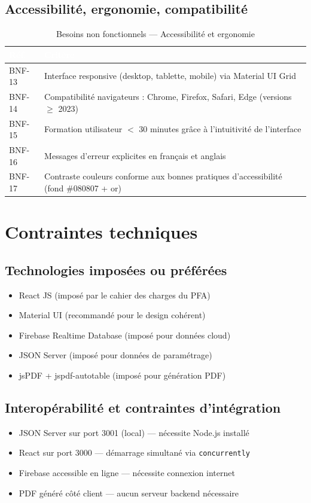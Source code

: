\documentclass[12pt,a4paper]{report}
\begin{document}
\subsection{Accessibilité, ergonomie, compatibilité}

\begin{table}[H]
\centering
\caption{Besoins non fonctionnels — Accessibilité et ergonomie}
\label{tab:bnf_ergo}
\begin{tabularx}{\textwidth}{|l|X|}
\hline
\rowcolor{emsiblue}\textcolor{white}{\textbf{Réf.}} & \textcolor{white}{\textbf{Critère}} \\
\hline
BNF-13 & Interface responsive (desktop, tablette, mobile) via Material UI Grid \\
BNF-14 & Compatibilité navigateurs : Chrome, Firefox, Safari, Edge (versions $\geq$ 2023) \\
BNF-15 & Formation utilisateur $<$ 30 minutes grâce à l'intuitivité de l'interface \\
BNF-16 & Messages d'erreur explicites en français et anglais \\
BNF-17 & Contraste couleurs conforme aux bonnes pratiques d'accessibilité (fond \#080807 + or) \\
\hline
\end{tabularx}
\end{table}

\section{Contraintes techniques}

\subsection{Technologies imposées ou préférées}
\begin{itemize}
    \item React JS (imposé par le cahier des charges du PFA)
    \item Material UI (recommandé pour le design cohérent)
    \item Firebase Realtime Database (imposé pour données cloud)
    \item JSON Server (imposé pour données de paramétrage)
    \item jsPDF + jspdf-autotable (imposé pour génération PDF)
\end{itemize}

\subsection{Interopérabilité et contraintes d'intégration}
\begin{itemize}
    \item JSON Server sur port 3001 (local) — nécessite Node.js installé
    \item React sur port 3000 — démarrage simultané via \texttt{concurrently}
    \item Firebase accessible en ligne — nécessite connexion internet
    \item PDF généré côté client — aucun serveur backend nécessaire
\end{itemize}
\end{document}
